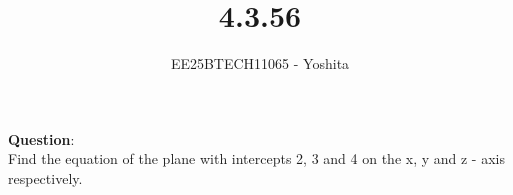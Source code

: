 \documentclass[journal]{IEEEtran}
\begin{document}

\vspace{3cm}

\title{4.3.56}
\author{EE25BTECH11065 - Yoshita}
{\let\newpage\relax\maketitle}

\renewcommand{\thefigure}{\theenumi}
\renewcommand{\thetable}{\theenumi}
\setlength{\intextsep}{10pt} %

\textbf{Question}:\\
Find the equation of the plane with intercepts 2, 3 and 4 on the x, y and z - axis respectively.\\
\bigskip
\end{document}
